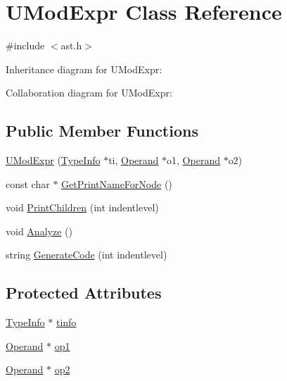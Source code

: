 \hypertarget{class_u_mod_expr}{}\section{U\+Mod\+Expr Class Reference}
\label{class_u_mod_expr}


{\ttfamily \#include $<$ast.\+h$>$}



Inheritance diagram for U\+Mod\+Expr\+:


Collaboration diagram for U\+Mod\+Expr\+:
\subsection*{Public Member Functions}
\begin{DoxyCompactItemize}
\item 
\hyperlink{class_u_mod_expr_abe3149348b7ff0fe00822f6457830135}{U\+Mod\+Expr} (\hyperlink{class_type_info}{Type\+Info} $\ast$ti, \hyperlink{class_operand}{Operand} $\ast$o1, \hyperlink{class_operand}{Operand} $\ast$o2)
\item 
const char $\ast$ \hyperlink{class_u_mod_expr_afd7d74abecfd12895ee20137c013729d}{Get\+Print\+Name\+For\+Node} ()
\item 
void \hyperlink{class_u_mod_expr_a77b079d55fdc1f8bd1e8266edc6959ea}{Print\+Children} (int indentlevel)
\item 
void \hyperlink{class_u_mod_expr_a0c1da57d7e2aff1e0e6f46f14f784a83}{Analyze} ()
\item 
string \hyperlink{class_u_mod_expr_a4ffcbf4138165e41c64b5aa3197df086}{Generate\+Code} (int indentlevel)
\end{DoxyCompactItemize}
\subsection*{Protected Attributes}
\begin{DoxyCompactItemize}
\item 
\hyperlink{class_type_info}{Type\+Info} $\ast$ \hyperlink{class_u_mod_expr_a7304199533423250b143f33edc88b6c7}{tinfo}
\item 
\hyperlink{class_operand}{Operand} $\ast$ \hyperlink{class_u_mod_expr_a28a8e54f87b32fe6bd6cd594f2a5d6ac}{op1}
\item 
\hyperlink{class_operand}{Operand} $\ast$ \hyperlink{class_u_mod_expr_a1c5fedbdc12e07f75acabffde2a56fa1}{op2}
\end{DoxyCompactItemize}


